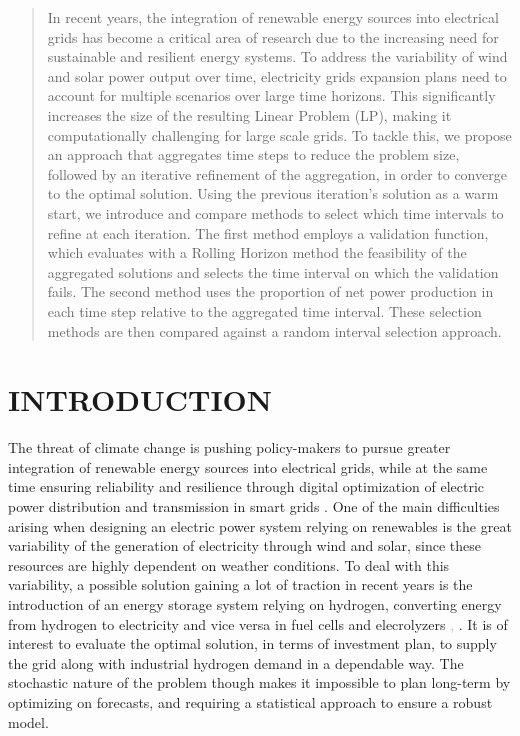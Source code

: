 \begin{abstract}
  In recent years, the integration of renewable energy sources into electrical grids has become a critical area of research due to the increasing need for sustainable and resilient energy systems. 
  To address the variability of wind and solar power output over time, electricity grids expansion plans need to account for multiple scenarios over large time horizons.
  This significantly increases the size of the resulting Linear Problem (LP), making it computationally challenging for large scale grids. 
  To tackle this, we propose an approach that aggregates time steps to reduce the problem size, followed by an iterative refinement of the aggregation, in order to converge to the optimal solution.
  Using the previous iteration's solution as a warm start, we introduce and compare methods to select which time intervals to refine at each iteration.
  The first method employs a validation function, which evaluates with a Rolling Horizon method the feasibility of the aggregated solutions and selects the time interval on which the validation fails. 
  The second method uses the proportion of net power production in each time step relative to the aggregated time interval. 
  These selection methods are then compared against a random interval selection approach. 


\end{abstract}



\newpage
\section{INTRODUCTION}


The threat of climate change is pushing policy-makers to pursue greater integration of renewable energy sources into
 electrical grids, while at the same time ensuring reliability and resilience through digital optimization of electric 
 power distribution and transmission in smart grids \textcolor{green}{\cite{EU_context}}. 
One of the main difficulties arising when designing an electric power system relying on renewables is the great variability
 of the generation of electricity through wind and solar, since these resources are highly dependent on weather conditions. 
To deal with this variability, a possible solution gaining a lot of traction in recent years is the introduction of an energy
 storage system relying on hydrogen, converting energy from hydrogen to electricity and vice versa in fuel cells and 
 elecrolyzers \textcolor{violet}{\cite{INTRO_blanco}, \cite{INTRO_parra}}. 
It is of interest to evaluate the optimal solution, in terms of investment plan, to supply the grid along with industrial
 hydrogen demand in a dependable way. 
The stochastic nature of the problem though makes it impossible to plan long-term by optimizing on forecasts, and requiring
 a statistical approach to ensure a robust model.

